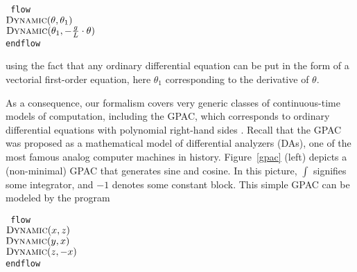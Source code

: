 \documentclass[envcountsame]{llncs}
\newenvironment{ttcode}{\begin{ttfamily}\rm\tt}{\end{ttfamily}}
\newcommand\s{\phantom{x}}
\begin{document}
 \begin{center}
  \begin{minipage}{8cm}
\begin{ttcode}
flow \\
 \s  $\textsc{Dynamic}(\theta,\theta_1)$ \\
\s  $\textsc{Dynamic}(\theta_1,-\frac{g}{L}\cdot \theta)$ \\
endflow
\end{ttcode}
   \end{minipage}
  \end{center}

\noindent
using the fact that any ordinary differential equation can be put in the form of a vectorial first-order equation, here $\theta_1$ corresponding to the derivative of $\theta$.

As a consequence, our formalism covers very generic classes of continuous-time models of computation, including the GPAC, which corresponds to ordinary differential equations with polynomial right-hand sides \cite{GC03,GBC09}.
Recall that the GPAC was proposed as a mathematical model of
differential analyzers (DAs), one of the most famous analog computer
machines in history.  Figure~\ref{gpac} (left) depicts a (non-minimal) GPAC that generates sine and cosine.
In this
picture,  $\int$ signifies  some integrator, and  $-1$ denotes
some constant block.
This simple GPAC can be modeled by the program

\begin{center}
 \begin{minipage}{8cm}
\begin{ttcode}
flow \\
 \s $\textsc{Dynamic}(x,z)$ \\
\s  $\textsc{Dynamic}(y,x)$ \\
\s  $\textsc{Dynamic}(z,-x)$ \\
endflow
\end{ttcode}
  \end{minipage}
 \end{center}
\end{document}
